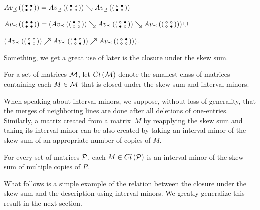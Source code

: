 \begin{prop}
$Av_{\preceq}\left(\left(\begin{smallmatrix}\bullet&\bullet\\\bullet&\circ\end{smallmatrix}\right)\right)=Av_{\preceq}\left(\left(\begin{smallmatrix}\bullet&\circ\\\circ&\circ\end{smallmatrix}\right)\right)\searrow Av_{\preceq}\left(\left(\begin{smallmatrix}\circ&\bullet\\\bullet&\circ\end{smallmatrix}\right)\right)$
\end{prop}

\begin{prop}
$Av_{\preceq}\left(\left(\begin{smallmatrix}\bullet&\bullet\\\bullet&\bullet\end{smallmatrix}\right)\right)=\left(Av_{\preceq}\left(\left(\begin{smallmatrix}\bullet&\circ\\\circ&\circ\end{smallmatrix}\right)\right)\searrow Av_{\preceq}\left(\left(\begin{smallmatrix}\circ&\bullet\\\bullet&\circ\end{smallmatrix}\right)\right)\searrow Av_{\preceq}\left(\left(\begin{smallmatrix}\circ&\circ\\\circ&\bullet\end{smallmatrix}\right)\right)\right)\cup$

\hspace{54mm}$\left(Av_{\preceq}\left(\left(\begin{smallmatrix}\circ&\circ\\\bullet&\circ\end{smallmatrix}\right)\right)\nearrow Av_{\preceq}\left(\left(\begin{smallmatrix}\bullet&\circ\\\circ&\bullet\end{smallmatrix}\right)\right)\nearrow Av_{\preceq}\left(\left(\begin{smallmatrix}\circ&\bullet\\\circ&\circ\end{smallmatrix}\right)\right)\right)$.
\end{prop}

Something, we get a great use of later is the closure under the skew sum.

\begin{defn}
For a set of matrices $\mathcal{M}$, let $Cl\left(\mathcal{M}\right)$ denote the smallest class of matrices containing each $M\in\mathcal{M}$ that is closed under the skew sum and interval minors.
\end{defn}

When speaking about interval minors, we suppose, without loss of generality, that the merges of neighboring lines are done after all deletions of one-entries. Similarly, a matrix created from a matrix~$M$ by reapplying the skew sum and taking its interval minor can be also created by taking an interval minor of the skew sum of an appropriate number of copies of $M$.

\begin{obs}
For every set of matrices $\mathcal{P}$, each $M\in Cl\left(\mathcal{P}\right)$ is an interval minor of the skew sum of multiple copies of $P$.
\end{obs}

What follows is a simple example of the relation between the closure under the skew sum and the description using interval minors. We greatly generalize this result in the next section.

